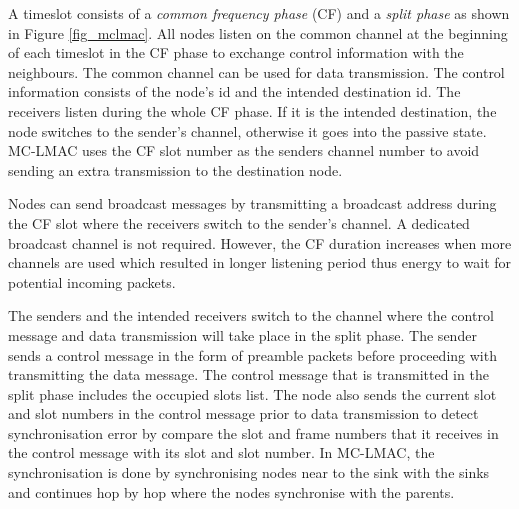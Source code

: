 A timeslot consists of a \textit{common frequency phase} (CF) and a \textit{split phase} as shown in Figure \ref{fig_mclmac}. All nodes listen on the common channel at the beginning of each timeslot in the CF phase to exchange control information with the neighbours. The common channel can be used for data transmission. The control information consists of the node's id and the intended destination id. The receivers listen during the whole CF phase. If it is the intended destination, the node switches to the sender's channel, otherwise it goes into the passive state. MC-LMAC uses the CF slot number as the senders channel number to avoid sending an extra transmission to the destination node.

Nodes can send broadcast messages by transmitting a broadcast address during the CF slot where the receivers switch to the sender's channel. A dedicated broadcast channel is not required. However, the CF duration increases when more channels are used which resulted in longer listening period thus energy to wait for potential incoming packets.

The senders and the intended receivers switch to the channel where the control message and data transmission will take place in the split phase. The sender sends a control message in the form of preamble packets before proceeding with transmitting the data message. The control message that is transmitted in the split phase includes the occupied slots list. The node also sends the current slot and slot numbers in the control message prior to data transmission to detect synchronisation error by compare the slot and frame numbers that it receives in the control message with its slot and slot number. In MC-LMAC, the synchronisation is done by synchronising nodes near to the sink with the sinks and continues hop by hop where the nodes synchronise with the parents. 
 




